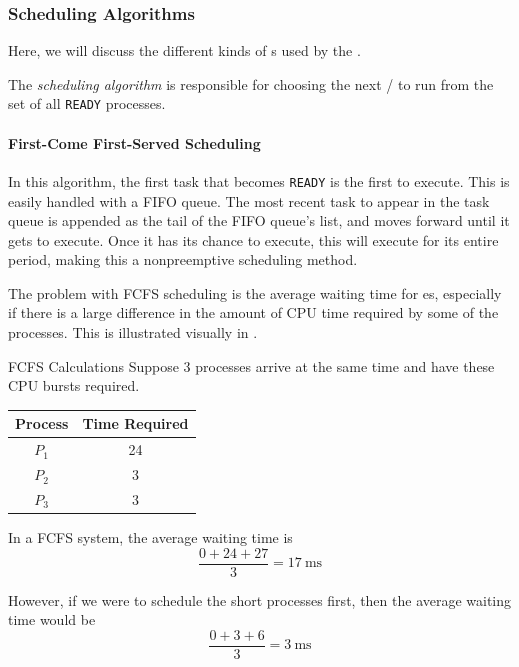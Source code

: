 \subsubsection{Scheduling Algorithms}\label{subsubsec:Scheduling_Algorithms}
Here, we will discuss the different kinds of s used by the .

\begin{definition}\label{def:Scheduling_Algorithm}
  The \emph{scheduling algorithm} is responsible for choosing the next / to run from the set of all \texttt{READY} processes.
\end{definition}

\paragraph{First-Come First-Served Scheduling}\label{par:FCFS_Scheduling}
In this algorithm, the first task that becomes \texttt{READY} is the first to execute.
This is easily handled with a FIFO queue.
The most recent task to appear in the task queue is appended as the tail of the FIFO queue's list, and moves forward until it gets to execute.
Once it has its chance to execute, this  will execute for its entire period, making this a nonpreemptive scheduling method.

The problem with FCFS scheduling is the average waiting time for es, especially if there is a large difference in the amount of CPU time required by some of the processes.
This is illustrated visually in .

\begin{example}[]{FCFS Calculations}
  Suppose 3 processes arrive at the same time and have these CPU bursts required.
  \begin{center}
    \begin{tabular}{cc}
      \toprule
      Process & Time Required \\
      \midrule
      $P_{1}$ & 24 \\
      $P_{2}$ & 3 \\
      $P_{3}$ & 3 \\
      \bottomrule
    \end{tabular}
  \end{center}
  \tcblower{}
  In a FCFS system, the average waiting time is
  \begin{equation*}
    \frac{0+24+27}{3} = \SI{17}{\milli \second}
  \end{equation*}

  However, if we were to schedule the short processes first, then the average waiting time would be
  \begin{equation*}
    \frac{0+3+6}{3} = \SI{3}{\milli \second}
  \end{equation*}
\end{example}


